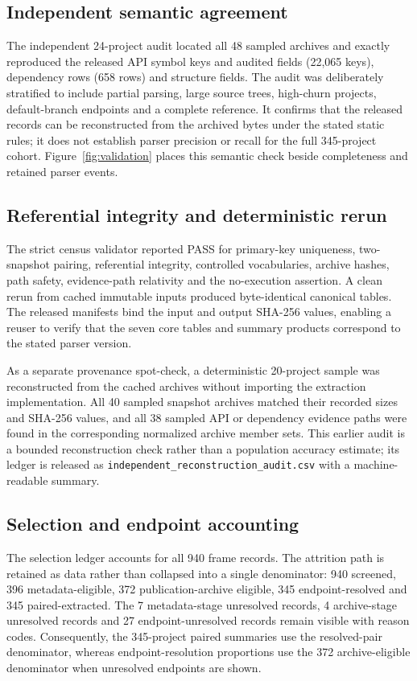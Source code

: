 \documentclass[10pt,a4paper]{article}
\newcommand{\code}[1]{\texttt{#1}}
\begin{document}
\subsection{Independent semantic agreement}

The independent 24-project audit located all 48 sampled archives and exactly reproduced the released API symbol keys and audited fields (22,065 keys), dependency rows (658 rows) and structure fields. The audit was deliberately stratified to include partial parsing, large source trees, high-churn projects, default-branch endpoints and a complete reference. It confirms that the released records can be reconstructed from the archived bytes under the stated static rules; it does not establish parser precision or recall for the full 345-project cohort. Figure~\ref{fig:validation} places this semantic check beside completeness and retained parser events.

\subsection{Referential integrity and deterministic rerun}

The strict census validator reported PASS for primary-key uniqueness, two-snapshot pairing, referential integrity, controlled vocabularies, archive hashes, path safety, evidence-path relativity and the no-execution assertion. A clean rerun from cached immutable inputs produced byte-identical canonical tables. The released manifests bind the input and output SHA-256 values, enabling a reuser to verify that the seven core tables and summary products correspond to the stated parser version.

As a separate provenance spot-check, a deterministic 20-project sample was reconstructed from the cached archives without importing the extraction implementation. All 40 sampled snapshot archives matched their recorded sizes and SHA-256 values, and all 38 sampled API or dependency evidence paths were found in the corresponding normalized archive member sets. This earlier audit is a bounded reconstruction check rather than a population accuracy estimate; its ledger is released as \code{independent\_reconstruction\_audit.csv} with a machine-readable summary.

\subsection{Selection and endpoint accounting}

The selection ledger accounts for all 940 frame records. The attrition path is retained as data rather than collapsed into a single denominator: 940 screened, 396 metadata-eligible, 372 publication-archive eligible, 345 endpoint-resolved and 345 paired-extracted. The 7 metadata-stage unresolved records, 4 archive-stage unresolved records and 27 endpoint-unresolved records remain visible with reason codes. Consequently, the 345-project paired summaries use the resolved-pair denominator, whereas endpoint-resolution proportions use the 372 archive-eligible denominator when unresolved endpoints are shown.
\end{document}
